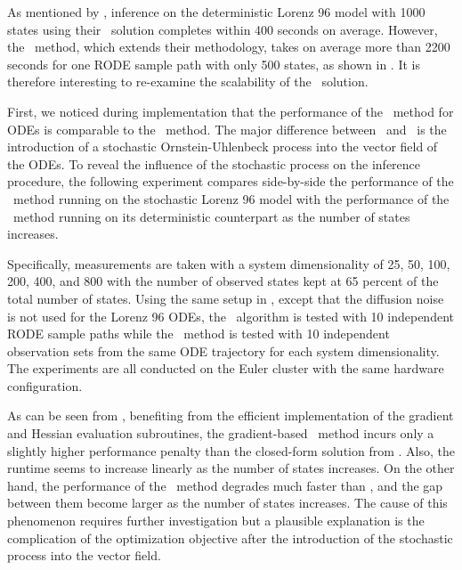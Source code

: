 As mentioned by \cite{gorbach2017scalable}, inference on the deterministic Lorenz 96 model with 1000 states using their \algovgmgp\ solution completes within 400 seconds on average.
However, the \algolpmfsde\ method, which extends their methodology, takes on average more than 2200 seconds for one RODE sample path with only 500 states, as shown in .
It is therefore interesting to re-examine the scalability of the \algolpmfsde\ solution.

First, we noticed during implementation that the performance of the \algolpmf\ method for ODEs is comparable to the \algovgmgp\ method.
The major difference between \algolpmfsde\ and \algolpmf\ is the introduction of a stochastic Ornstein-Uhlenbeck process into the vector field of the ODEs.
To reveal the influence of the stochastic process on the inference procedure, the following experiment compares side-by-side the performance of the \algolpmfsde\ method running on the stochastic Lorenz 96 model with the performance of the \algolpmf\ method running on its deterministic counterpart as the number of states increases.

Specifically, measurements are taken with a system dimensionality of 25, 50, 100, 200, 400, and 800 with the number of observed states kept at 65 percent of the total number of states.
Using the same setup in , except that the diffusion noise is not used for the Lorenz 96 ODEs, the \algolpmfsde\ algorithm is tested with 10 independent RODE sample paths while the \algolpmf\ method is tested with 10 independent observation sets from the same ODE trajectory for each system dimensionality.
The experiments are all conducted on the Euler cluster with the same hardware configuration.

As can be seen from , benefiting from the efficient implementation of the gradient and Hessian evaluation subroutines, the gradient-based \algolpmf\ method incurs only a slightly higher performance penalty than the closed-form solution from \algovgmgp.
Also, the runtime seems to increase linearly as the number of states increases.
On the other hand, the performance of the \algolpmfsde\ method degrades much faster than \algolpmf, and the gap between them become larger as the number of states increases.
The cause of this phenomenon requires further investigation but a plausible explanation is the complication of the optimization objective after the introduction of the stochastic process into the vector field.

